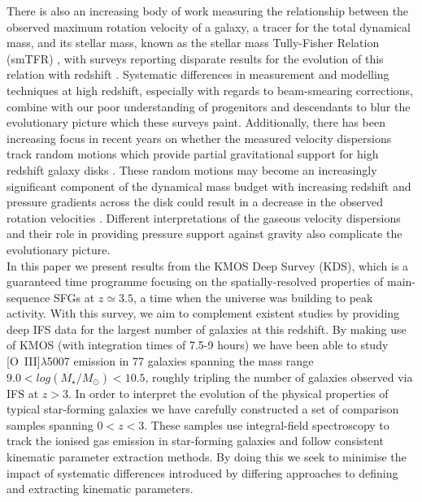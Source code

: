 \documentclass[fleqn,usenatbib]{mnras}
\begin{document}
There is also an increasing body of work measuring the relationship between the observed maximum rotation velocity of a galaxy, a tracer for the total dynamical mass, and its stellar mass, known as the stellar mass Tully-Fisher Relation (smTFR) \citep{Tully1977}, with surveys reporting disparate results for the evolution of this relation with redshift \citep[e.g.][]{Puech2008,Miller2011,Gnerucci2011,Swinbank2012,Simons2016,Tiley2016,Harrison2017,Straatman2017,Ubler2017}.
Systematic differences in measurement and modelling techniques at high redshift, especially with regards to beam-smearing corrections, combine with our poor understanding of progenitors and descendants to blur the evolutionary picture which these surveys paint.
Additionally, there has been increasing focus in recent years on whether the measured velocity dispersions track random motions which provide partial gravitational support for high redshift galaxy disks \citep[e.g.][]{Burkert2010,Wuyts2016b,Ubler2017,Genzel2017,Lang2017}.
These random motions may become an increasingly significant component of the dynamical mass budget with increasing redshift \citep{Wuyts2016b} and pressure gradients across the disk could result in a decrease in the observed rotation velocities \citep{Burkert2010}. 
Different interpretations of the gaseous velocity dispersions and their role in providing pressure support against gravity also complicate the evolutionary picture. \\

\noindent
In this paper we present results from the KMOS Deep Survey (KDS), which is a guaranteed time programme focusing on the spatially-resolved properties of main-sequence SFGs at $z\simeq3.5$, a time when the universe was building to peak activity.
With this survey, we aim to complement existent studies by providing deep IFS data for the largest number of galaxies at this redshift.
By making use of KMOS (with integration times of 7.5-9 hours) we have been able to study [O~{\sc III}]$\lambda$5007 emission in 77 galaxies spanning the mass range $9.0 < log(M_{\star}/M_{\odot}) < 10.5$, roughly tripling the number of galaxies observed via IFS at $z > 3$.
In order to interpret the evolution of the physical properties of typical star-forming galaxies we have carefully constructed a set of comparison samples spanning $0 < z < 3$.
These samples use integral-field spectroscopy to track the ionised gas emission in star-forming galaxies and follow consistent kinematic parameter extraction methods.  
By doing this we seek to minimise the impact of systematic differences introduced by differing approaches to defining and extracting kinematic parameters.
\end{document}
